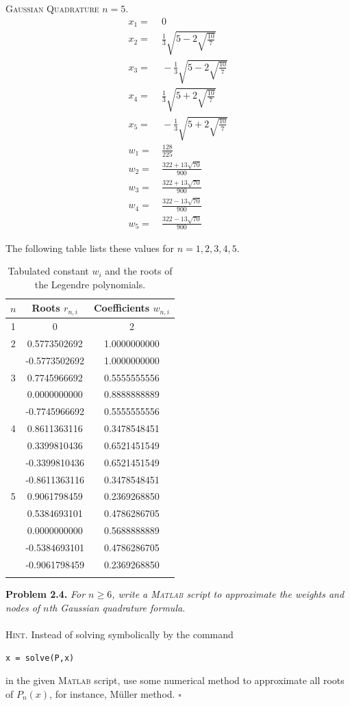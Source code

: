 \documentclass[a4paper]{article}
\numberwithin{equation}{section}
\begin{document}
\textsc{Gaussian Quadrature $n=5$.}
\begin{align}
{x_1} =&\ 0\\
{x_2} =&\ \frac{1}{3}\sqrt {5 - 2\sqrt {\frac{{10}}{7}} } \\
{x_3} =&\  - \frac{1}{3}\sqrt {5 - 2\sqrt {\frac{{10}}{7}} } \\
{x_4} =&\ \frac{1}{3}\sqrt {5 + 2\sqrt {\frac{{10}}{7}} } \\
{x_5} =&\  - \frac{1}{3}\sqrt {5 + 2\sqrt {\frac{{10}}{7}} } \\
{w_1} =&\ \frac{{128}}{{225}}\\
{w_2} =&\ \frac{{322 + 13\sqrt {70} }}{{900}}\\
{w_3} =&\ \frac{{322 + 13\sqrt {70} }}{{900}}\\
{w_4} =&\ \frac{{322 - 13\sqrt {70} }}{{900}}\\
{w_5} =&\ \frac{{322 - 13\sqrt {70} }}{{900}}
\end{align}

The following table lists these values for $n=1,2,3,4,5$.
\begin{center}
\begin{longtable}{|c|c|c|}
\hline
$n$ & \textbf{Roots $r_{n,i}$} & \textbf{Coefficients $w_{n,i}$}\\
\hline
1 & 0 & 2\\
\hline
2 & 0.5773502692 & 1.0000000000\\
 & -0.5773502692 & 1.0000000000\\
 \hline
3 & 0.7745966692 & 0.5555555556\\
 & 0.0000000000 & 0.8888888889\\
 & -0.7745966692 & 0.5555555556\\
 \hline
4 & 0.8611363116 & 0.3478548451\\
 & 0.3399810436 & 0.6521451549\\
 & -0.3399810436 & 0.6521451549\\
 & -0.8611363116 & 0.3478548451\\
 \hline
5 & 0.9061798459 & 0.2369268850\\
 & 0.5384693101 & 0.4786286705\\
 & 0.0000000000 & 0.5688888889\\
 & -0.5384693101 & 0.4786286705\\
 & -0.9061798459  & 0.2369268850\\
 \hline
 \caption{Tabulated constant $w_i$ and the roots of the Legendre polynomials.}
\end{longtable}
\end{center}
\textbf{Problem 2.4.} \textit{For $n\ge 6$, write a \textsc{Matlab} script to approximate the weights and nodes of $n$th Gaussian quadrature formula.}\\
\\
\textsc{Hint.} Instead of solving symbolically by the command
\begin{verbatim}
x = solve(P,x)
\end{verbatim} 
in the given \textsc{Matlab} script, use some numerical method to approximate all roots of $P_n\left(x\right)$, for instance, M\"{u}ller method. \hfill $\square$
\end{document}

